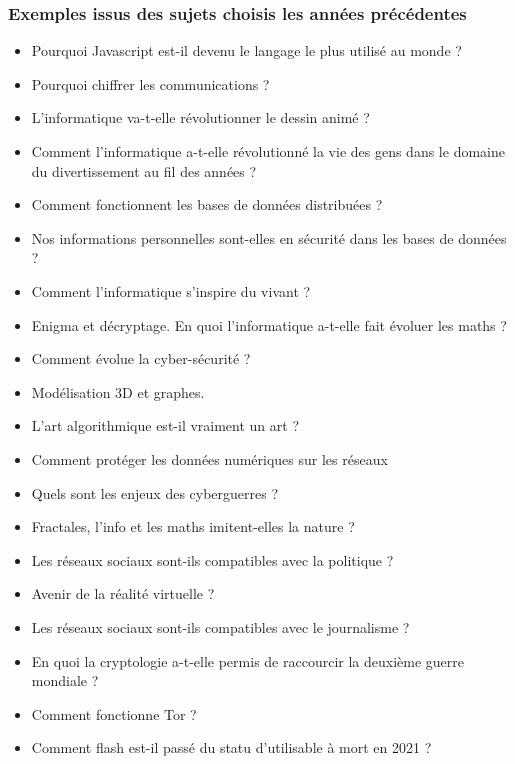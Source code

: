 \documentclass[
  letterpaper,
  DIV=11,
  numbers=noendperiod]{scrartcl}
\providecommand{\tightlist}{%
  \setlength{\itemsep}{0pt}\setlength{\parskip}{0pt}}\usepackage{longtable,booktabs,array}
\begin{document}
\hypertarget{exemples-issus-des-sujets-choisis-les-annuxe9es-pruxe9cuxe9dentes}{%
\subsubsection{Exemples issus des sujets choisis les années
précédentes}\label{exemples-issus-des-sujets-choisis-les-annuxe9es-pruxe9cuxe9dentes}}

\begin{itemize}
\tightlist
\item
  Pourquoi Javascript est-il devenu le langage le plus utilisé au monde
  ?
\item
  Pourquoi chiffrer les communications ?
\item
  L'informatique va-t-elle révolutionner le dessin animé ?
\item
  Comment l'informatique a-t-elle révolutionné la vie des gens dans le
  domaine du divertissement au fil des années ?
\item
  Comment fonctionnent les bases de données distribuées ?
\item
  Nos informations personnelles sont-elles en sécurité dans les bases de
  données ?
\item
  Comment l'informatique s'inspire du vivant ?
\item
  Enigma et décryptage. En quoi l'informatique a-t-elle fait évoluer les
  maths ?
\item
  Comment évolue la cyber-sécurité ?
\item
  Modélisation 3D et graphes.
\item
  L'art algorithmique est-il vraiment un art ?
\item
  Comment protéger les données numériques sur les réseaux
\item
  Quels sont les enjeux des cyberguerres ?
\item
  Fractales, l'info et les maths imitent-elles la nature ?
\item
  Les réseaux sociaux sont-ils compatibles avec la politique ?
\item
  Avenir de la réalité virtuelle ?
\item
  Les réseaux sociaux sont-ils compatibles avec le journalisme ?
\item
  En quoi la cryptologie a-t-elle permis de raccourcir la deuxième
  guerre mondiale ?
\item
  Comment fonctionne Tor ?
\item
  Comment flash est-il passé du statu d'utilisable à mort en 2021 ?

\end{itemize}
\end{document}
